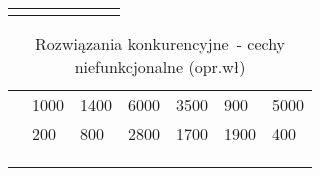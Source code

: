 \begin{minipage}{\textwidth}
\begin{table}[H]
\begin{tabular}{|P{.22\textwidth}|P{.09\textwidth}|P{.09\textwidth}|P{.09\textwidth}|P{.09\textwidth}|P{.09\textwidth}|P{.09\textwidth}|}
                    &        &            &           &             &        &      \\ \hline
                    &        &            &           &             &        &      \\ \hline
        \end{tabular}
    \end{table}
\end{minipage}

\begin{minipage}{\textwidth}
    \begin{table}[H]
        \centering\caption{Rozwiązania konkurencyjne~- cechy niefunkcjonalne (opr.wł)\label{tabela:rozwiazania-konkurencyjne-niefunkcjonalne}}
        \begin{tabular}{|P{.22\textwidth}|P{.09\textwidth}|P{.09\textwidth}|P{.09\textwidth}|P{.09\textwidth}|P{.09\textwidth}|P{.09\textwidth}|}
            \hline
                                                            &    &    &  &          &    &    \\ \hline
                        & 1000      & 1400          & 6000         & 3500           & 900       & 5000    \\ \hline
                       & 200       & 800           & 2800         & 1700           & 1900      & 400     \\ \hline
                                   &        &            &           &             &        &      \\ \hline
                                    &        &            &           &             &        &      \\ \hline
                 &        &            &           &             &        &      \\ \hline

\end{tabular}
\end{table}
\end{minipage}

